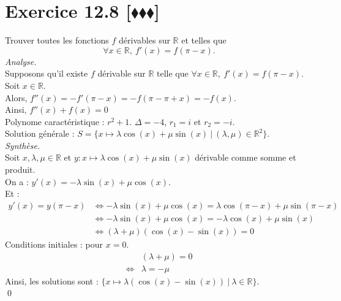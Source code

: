 \documentclass[10pt]{article}
\begin{document}
\section*{Exercice 12.8 [$\blacklozenge\blacklozenge\blacklozenge$]}
\begin{tcolorbox}[enhanced, width=7.5in, center, size=fbox, fontupper=\large, drop shadow southwest]
    Trouver toutes les fonctions $f$ dérivables sur $\mathbb{R}$ et telles que
    \begin{equation*}
        \forall x \in \mathbb{R}, ~ f'(x) = f(\pi - x).
    \end{equation*}
    \emph{Analyse.}\\
    Supposons qu'il existe $f$ dérivable sur $\mathbb{R}$ telle que $\forall x \in \mathbb{R}, ~ f'(x) = f(\pi-x)$.\\
    Soit $x\in\mathbb{R}$.\\
    Alors, $f''(x) = -f'(\pi-x) = -f(\pi - \pi + x) = -f(x)$.\\
    Ainsi, $f''(x) + f(x) = 0$\\
    Polynome caractéristique : $r^2 + 1$. $\Delta = -4$, $r_1=i$ et $r_2=-i$.\\
    Solution générale : $S = \{x\mapsto \lambda \cos(x) + \mu \sin(x) ~ | ~ (\lambda, \mu) \in \mathbb{R}^2\}$.\\
    \emph{Synthèse.}\\
    Soit $x,\lambda,\mu\in\mathbb{R}$ et $y:x\mapsto\lambda\cos(x) + \mu\sin(x)$ dérivable comme somme et produit.\\
    On a : $y'(x) = -\lambda\sin(x) + \mu\cos(x)$.\\
    Et : 
    \begin{align*}
        y'(x) = y(\pi - x) &\iff -\lambda\sin(x) + \mu\cos(x) = \lambda\cos(\pi - x) + \mu\sin(\pi - x)\\
        &\iff -\lambda\sin(x) + \mu\cos(x) = -\lambda\cos(x) + \mu\sin(x)\\
        &\iff (\lambda + \mu)(\cos(x) - \sin(x)) = 0
    \end{align*}
    Conditions initiales : pour $x=0$.
    \begin{align*}
        &(\lambda + \mu) = 0\\
        \iff& \lambda = -\mu
    \end{align*}
    Ainsi, les solutions sont : $\{x\mapsto \lambda(\cos(x) - \sin(x)) ~ | ~ \lambda \in \mathbb{R}\}$.\\
    \qed
\end{tcolorbox}
\end{document}
